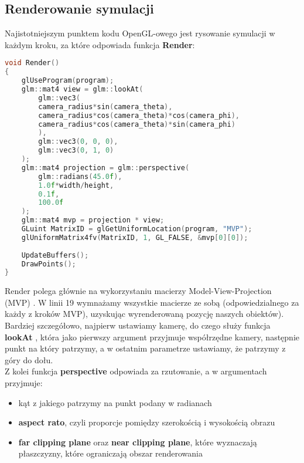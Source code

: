 \documentclass[14pt,twoside,a4paper]{article}
\theoremstyle{definition}
\begin{document}
\subsection{\large Renderowanie symulacji}

Najistotniejszym punktem kodu OpenGL-owego jest rysowanie symulacji w każdym kroku, za które odpowiada funkcja \textbf{Render}:
\begin{lstlisting}[language=C++, frame=single, framerule=2pt, caption=Pseudokod renderowania symulacji]
void Render() 
{
    glUseProgram(program);
    glm::mat4 view = glm::lookAt(
        glm::vec3(
        camera_radius*sin(camera_theta),
        camera_radius*cos(camera_theta)*cos(camera_phi),
        camera_radius*cos(camera_theta)*sin(camera_phi)
        ),
        glm::vec3(0, 0, 0),
        glm::vec3(0, 1, 0)
    );
    glm::mat4 projection = glm::perspective(
        glm::radians(45.0f),
        1.0f*width/height,
        0.1f,
        100.0f
    );
    glm::mat4 mvp = projection * view;
    GLuint MatrixID = glGetUniformLocation(program, "MVP");
    glUniformMatrix4fv(MatrixID, 1, GL_FALSE, &mvp[0][0]);
    
    UpdateBuffers();
    DrawPoints();
}
\end{lstlisting}
\bigskip

Render polega głównie na wykorzystaniu macierzy Model-View-Projection (MVP) \cite{tutMat}. 
W linii 19 wymnażamy wszystkie macierze ze sobą (odpowiedzialnego za każdy z kroków MVP), uzyskując wyrenderowaną pozycję naszych obiektów).\\

Bardziej szczegółowo, najpierw ustawiamy kamerę, do czego służy funkcja \textbf{lookAt} \cite{opengl}, która jako pierwszy argument przyjmuje współrzędne kamery, następnie punkt na który patrzymy, a w ostatnim parametrze ustawiamy, że patrzymy z góry do dołu.\\
Z kolei funkcja \textbf{perspective} \cite{opengl} odpowiada za rzutowanie, a w argumentach przyjmuje:
\begin{itemize}
\item kąt z jakiego patrzymy na punkt podany w radianach
\item \textbf{aspect rato}, czyli proporcje pomiędzy szerokością i wysokością obrazu
\item \textbf{far clipping plane} oraz \textbf{near clipping plane}, które wyznaczają płaszczyzny, które ograniczają obszar renderowania
\end{itemize} 
\end{document}
